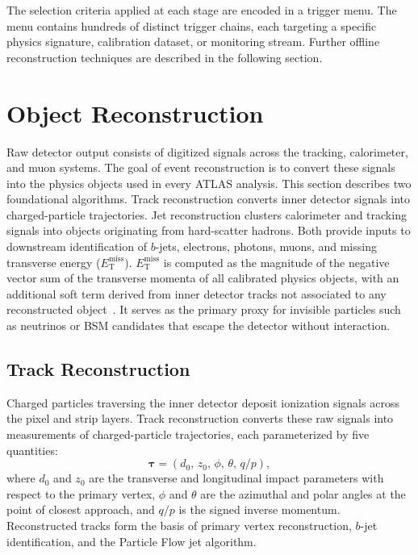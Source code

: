 The selection criteria applied at each stage are encoded in a trigger menu. 
The menu contains hundreds of distinct trigger chains, each targeting a specific physics signature, calibration dataset, or monitoring stream. 
Further offline reconstruction techniques are described in the following section.

\section{Object Reconstruction}

Raw detector output consists of digitized signals across the tracking, calorimeter, and muon systems. 
The goal of event reconstruction is to convert these signals into the physics objects used in every ATLAS analysis. 
This section describes two foundational algorithms.
Track reconstruction converts inner detector signals into charged-particle trajectories.
Jet reconstruction clusters calorimeter and tracking signals into objects originating from hard-scatter hadrons.
Both provide inputs to downstream identification of $b$-jets, electrons, photons, muons, and missing transverse energy ($E_{\mathrm{T}}^{\mathrm{miss}}$).
$E_{\mathrm{T}}^{\mathrm{miss}}$ is computed as the magnitude of the negative vector sum of the transverse momenta of all calibrated physics objects, with an additional soft term derived from inner detector tracks not associated to any reconstructed object~\cite{ATLASMETRun2}.
It serves as the primary proxy for invisible particles such as neutrinos or BSM candidates that escape the detector without interaction.

\subsection{Track Reconstruction}
\label{sec:track_reco}

Charged particles traversing the inner detector deposit ionization signals across the pixel and strip layers. 
Track reconstruction converts these raw signals into measurements of charged-particle trajectories, each parameterized by five quantities:
%
\begin{equation}
	\boldsymbol{\tau} = (d_0,\, z_0,\, \phi,\, \theta,\, q/p),
	\label{eq:track_params}
\end{equation}
%
where $d_0$ and $z_0$ are the transverse and longitudinal impact parameters with respect to the primary vertex, $\phi$ and $\theta$ are the azimuthal and polar angles at the point of closest approach, and $q/p$ is the signed inverse momentum.
Reconstructed tracks form the basis of primary vertex reconstruction, $b$-jet identification, and the Particle Flow jet algorithm.

